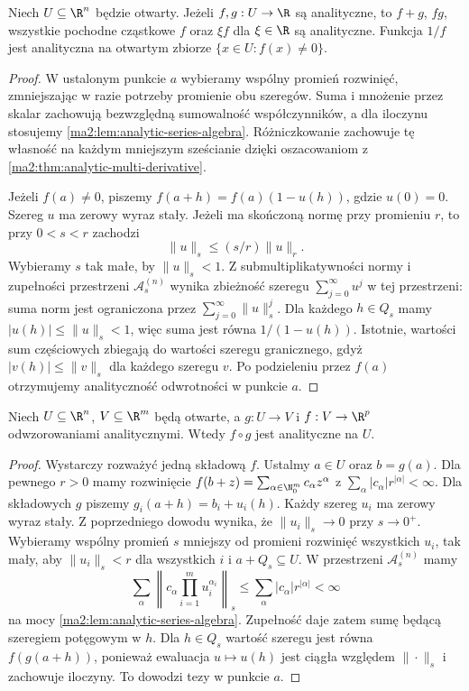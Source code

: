 \begin{wniosek}
\label{ma2:cor:analytic-algebra}
Niech $U\subseteq\R^n$ będzie otwarty.
Jeżeli $f,g:U\to\R$ są analityczne, to
$f+g$, $fg$, wszystkie pochodne cząstkowe $f$
oraz $\xi f$ dla $\xi\in\R$ są analityczne.
Funkcja $1/f$ jest analityczna na otwartym zbiorze
$\{x\in U:f(x)\ne0\}$.
\end{wniosek}
\begin{proof}
W ustalonym punkcie $a$ wybieramy wspólny
promień rozwinięć, zmniejszając w razie potrzeby
promienie obu szeregów.
Suma i mnożenie przez skalar zachowują
bezwzględną sumowalność współczynników,
a dla iloczynu stosujemy
\ref{ma2:lem:analytic-series-algebra}.
Różniczkowanie zachowuje tę własność
na każdym mniejszym sześcianie dzięki
oszacowaniom z
\ref{ma2:thm:analytic-multi-derivative}.

Jeżeli $f(a)\ne0$, piszemy
$f(a+h)=f(a)(1-u(h))$, gdzie $u(0)=0$.
Szereg $u$ ma zerowy wyraz stały.
Jeżeli ma skończoną normę przy promieniu $r$,
to przy $0<s<r$ zachodzi
\[
 \|u\|_s\le(s/r)\|u\|_r.
\]
Wybieramy $s$ tak małe, by $\|u\|_s<1$.
Z submultiplikatywności normy
i zupełności przestrzeni
$\mathcal A_s^{(n)}$ wynika zbieżność
szeregu $\sum_{j=0}^\infty u^j$ w tej przestrzeni:
suma norm jest ograniczona przez
$\sum_{j=0}^\infty\|u\|_s^j$.
Dla każdego $h\in Q_s$ mamy
$|u(h)|\le\|u\|_s<1$, więc suma
jest równa $1/(1-u(h))$.
Istotnie, wartości sum częściowych zbiegają
do wartości szeregu granicznego, gdyż
$|v(h)|\le\|v\|_s$ dla każdego szeregu $v$.
Po podzieleniu przez $f(a)$ otrzymujemy
analityczność odwrotności w punkcie $a$.
\end{proof}

\begin{twierdzenie}
\label{ma2:thm:analytic-composition}
Niech $U\subseteq\R^n$, $V\subseteq\R^m$
będą otwarte, a $g:U\to V$ i $f:V\to\R^p$
odwzorowaniami analitycznymi.
Wtedy $f\circ g$ jest analityczne na $U$.
\end{twierdzenie}
\begin{proof}
Wystarczy rozważyć jedną składową $f$.
Ustalmy $a\in U$ oraz $b=g(a)$.
Dla pewnego $r>0$ mamy rozwinięcie
$f(b+z)=\sum_{\alpha\in\N_0^m}c_\alpha z^\alpha$
z $\sum_\alpha|c_\alpha|r^{|\alpha|}<\infty$.
Dla składowych $g$ piszemy
$g_i(a+h)=b_i+u_i(h)$.
Każdy szereg $u_i$ ma zerowy wyraz stały.
Z poprzedniego dowodu wynika, że
$\|u_i\|_s\to0$ przy $s\to0^+$.
Wybieramy wspólny promień $s$ mniejszy
od promieni rozwinięć wszystkich $u_i$,
tak mały, aby $\|u_i\|_s<r$ dla wszystkich $i$
i $a+Q_s\subseteq U$.
W przestrzeni $\mathcal A_s^{(n)}$ mamy
\[
 \sum_\alpha\left\|c_\alpha
 \prod_{i=1}^m u_i^{\alpha_i}\right\|_s
 \le \sum_\alpha |c_\alpha|r^{|\alpha|}<\infty
\]
na mocy \ref{ma2:lem:analytic-series-algebra}.
Zupełność daje zatem sumę będącą
szeregiem potęgowym w $h$.
Dla $h\in Q_s$ wartość szeregu jest
równa $f(g(a+h))$, ponieważ ewaluacja
$u\mapsto u(h)$ jest ciągła względem
$\|\cdot\|_s$ i zachowuje iloczyny.
To dowodzi tezy w punkcie $a$.
\end{proof}

